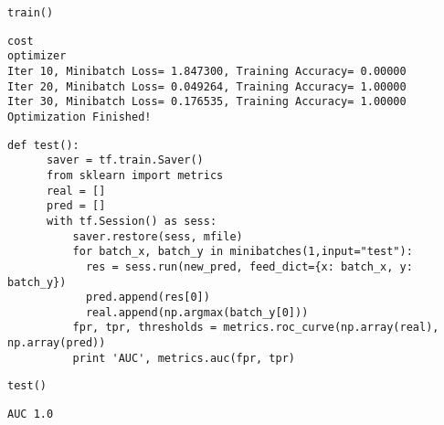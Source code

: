 \documentclass[12pt,fleqn]{article}\usepackage{../../common}
\begin{document}
\begin{verbatim}
train()
\end{verbatim}

\begin{verbatim}
cost
optimizer
Iter 10, Minibatch Loss= 1.847300, Training Accuracy= 0.00000
Iter 20, Minibatch Loss= 0.049264, Training Accuracy= 1.00000
Iter 30, Minibatch Loss= 0.176535, Training Accuracy= 1.00000
Optimization Finished!
\end{verbatim}

\begin{verbatim}
def test():      
      saver = tf.train.Saver()
      from sklearn import metrics
      real = []
      pred = []
      with tf.Session() as sess:
          saver.restore(sess, mfile)
          for batch_x, batch_y in minibatches(1,input="test"):
            res = sess.run(new_pred, feed_dict={x: batch_x, y: batch_y})
            pred.append(res[0])
            real.append(np.argmax(batch_y[0]))
          fpr, tpr, thresholds = metrics.roc_curve(np.array(real), np.array(pred))
          print 'AUC', metrics.auc(fpr, tpr)      
\end{verbatim}

\begin{verbatim}
test()
\end{verbatim}                    

\begin{verbatim}
AUC 1.0
\end{verbatim}
\end{document}
